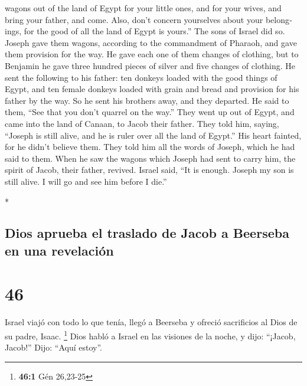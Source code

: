 \begin{paracol}{2}
\begin{otherlanguage}{english}
wagons out of the land of Egypt for your little ones, and for your
wives, and bring your father, and come.  Also, don't
concern yourselves about your belongings, for the good of all the land
of Egypt is yours.''  The sons of Israel did so. Joseph
gave them wagons, according to the commandment of Pharaoh, and gave them
provision for the way.  He gave each one of them changes
of clothing, but to Benjamin he gave three hundred pieces of silver and
five changes of clothing.  He sent the following to his
father: ten donkeys loaded with the good things of Egypt, and ten female
donkeys loaded with grain and bread and provision for his father by the
way.  So he sent his brothers away, and they departed. He
said to them, ``See that you don't quarrel on the way.'' 
They went up out of Egypt, and came into the land of Canaan, to Jacob
their father.  They told him, saying, ``Joseph is still
alive, and he is ruler over all the land of Egypt.'' His heart fainted,
for he didn't believe them.  They told him all the words
of Joseph, which he had said to them. When he saw the wagons which
Joseph had sent to carry him, the spirit of Jacob, their father,
revived.  Israel said, ``It is enough. Joseph my son is
still alive. I will go and see him before I die.''

\end{otherlanguage}

\switchcolumn[0]*

\hypertarget{dios-aprueba-el-traslado-de-jacob-a-beerseba-en-una-revelaciuxf3n}{%
\subsection{Dios aprueba el traslado de Jacob a Beerseba en una
revelación}\label{dios-aprueba-el-traslado-de-jacob-a-beerseba-en-una-revelaciuxf3n}}

\hypertarget{section-90}{%
\section{46}\label{section-90}}

 Israel viajó con todo lo que tenía, llegó a Beerseba y
ofreció sacrificios al Dios de su padre, Isaac. \footnote{\textbf{46:1}
  Gén 26,23-25}  Dios habló a Israel en las visiones de la
noche, y dijo: ``¡Jacob, Jacob!'' Dijo: ``Aquí estoy''.


\end{paracol}
